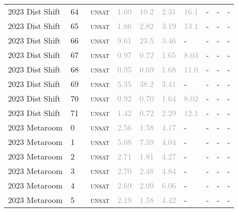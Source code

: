 \begin{center}
{\begin{longtable}{@{}llllllllll@{}}
2023 Dist Shift & 64 & ~\textsc{unsat} & \textcolor{darkgray}{1.60} & \textcolor{darkgray}{10.2} & \textcolor{darkgray}{2.31} & \textcolor{darkgray}{16.1} & - & - & - \\
2023 Dist Shift & 65 & ~\textsc{unsat} & \textcolor{darkgray}{1.86} & \textcolor{darkgray}{2.82} & \textcolor{darkgray}{3.19} & \textcolor{darkgray}{13.1} & - & - & - \\
2023 Dist Shift & 66 & ~\textsc{unsat} & \textcolor{darkgray}{9.61} & \textcolor{darkgray}{23.5} & \textcolor{darkgray}{3.46} & - & - & - & - \\
2023 Dist Shift & 67 & ~\textsc{unsat} & \textcolor{darkgray}{0.97} & \textcolor{darkgray}{0.72} & \textcolor{darkgray}{1.65} & \textcolor{darkgray}{8.03} & - & - & - \\
2023 Dist Shift & 68 & ~\textsc{unsat} & \textcolor{darkgray}{0.95} & \textcolor{darkgray}{0.69} & \textcolor{darkgray}{1.68} & \textcolor{darkgray}{11.0} & - & - & - \\
2023 Dist Shift & 69 & ~\textsc{unsat} & \textcolor{darkgray}{5.35} & \textcolor{darkgray}{38.2} & \textcolor{darkgray}{3.41} & - & - & - & - \\
2023 Dist Shift & 70 & ~\textsc{unsat} & \textcolor{darkgray}{0.92} & \textcolor{darkgray}{0.70} & \textcolor{darkgray}{1.64} & \textcolor{darkgray}{8.02} & - & - & - \\
2023 Dist Shift & 71 & ~\textsc{unsat} & \textcolor{darkgray}{1.42} & \textcolor{darkgray}{0.72} & \textcolor{darkgray}{2.29} & \textcolor{darkgray}{12.1} & - & - & - \\
\midrule
2023 Metaroom & 0 & ~\textsc{unsat} & \textcolor{darkgray}{2.56} & \textcolor{darkgray}{1.58} & \textcolor{darkgray}{4.17} & - & - & - & - \\
2023 Metaroom & 1 & ~\textsc{unsat} & \textcolor{darkgray}{5.08} & \textcolor{darkgray}{7.59} & \textcolor{darkgray}{4.04} & - & - & - & - \\
2023 Metaroom & 2 & ~\textsc{unsat} & \textcolor{darkgray}{2.71} & \textcolor{darkgray}{1.81} & \textcolor{darkgray}{4.27} & - & - & - & - \\
2023 Metaroom & 3 & ~\textsc{unsat} & \textcolor{darkgray}{2.70} & \textcolor{darkgray}{2.48} & \textcolor{darkgray}{4.84} & - & - & - & - \\
2023 Metaroom & 4 & ~\textsc{unsat} & \textcolor{darkgray}{2.69} & \textcolor{darkgray}{2.09} & \textcolor{darkgray}{6.06} & - & - & - & - \\
2023 Metaroom & 5 & ~\textsc{unsat} & \textcolor{darkgray}{2.19} & \textcolor{darkgray}{1.58} & \textcolor{darkgray}{4.42} & - & - & - & - \\

\end{longtable}}
\end{center}

